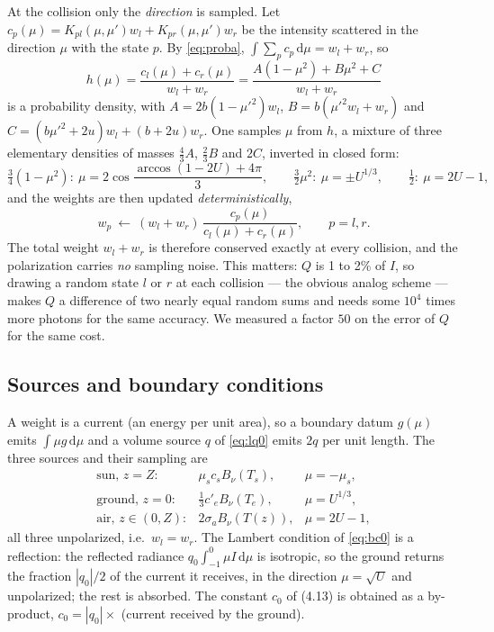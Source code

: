 \documentclass[11pt,a4paper]{article}
\renewcommand{\d}{\,\mathrm{d}}
\begin{document}
At the collision only the \emph{direction} is sampled. Let
$c_p(\mu)=K_{pl}(\mu,\mu')w_l+K_{pr}(\mu,\mu')w_r$ be the intensity scattered in the
direction $\mu$ with the state $p$. By \eqref{eq:proba}, $\int\sum_pc_p\d\mu=w_l+w_r$, so
\[
h(\mu)=\frac{c_l(\mu)+c_r(\mu)}{w_l+w_r}
=\frac{A(1-\mu^2)+B\mu^2+C}{w_l+w_r}
\]
is a probability density, with $A=2b(1-\mu'^2)w_l$, $B=b(\mu'^2w_l+w_r)$ and
$C=(b\mu'^2+2u)w_l+(b+2u)w_r$. One samples $\mu$ from $h$, a mixture of three elementary
densities of masses $\frac43A$, $\frac23B$ and $2C$, inverted in closed form:
\[
\tfrac34(1-\mu^2):\ \mu=2\cos\frac{\arccos(1-2U)+4\pi}{3},\qquad
\tfrac32\mu^2:\ \mu=\pm U^{1/3},\qquad
\tfrac12:\ \mu=2U-1,
\]
and the weights are then updated \emph{deterministically},
\begin{equation}\label{eq:wsplit}
w_p\ \longleftarrow\ (w_l+w_r)\,\frac{c_p(\mu)}{c_l(\mu)+c_r(\mu)},\qquad p=l,r .
\end{equation}
The total weight $w_l+w_r$ is therefore conserved exactly at every collision, and the
polarization carries \emph{no} sampling noise. This matters: $Q$ is 1 to 2\% of $I$, so
drawing a random state $l$ or $r$ at each collision --- the obvious analog scheme --- makes
$Q$ a difference of two nearly equal random sums and needs some $10^4$ times more photons
for the same accuracy. We measured a factor $50$ on the error of $Q$ for the same cost.

\subsection{Sources and boundary conditions}
A weight is a current (an energy per unit area), so a boundary datum $g(\mu)$ emits
$\int\mu g\d\mu$ and a volume source $q$ of \eqref{eq:lq0} emits $2q$ per unit length.
The three sources and their sampling are
\[
\begin{array}{lll}
\text{sun, } z=Z: & \mu_sc_sB_\nu(T_s), & \mu=-\mu_s,\\[2pt]
\text{ground, } z=0: & \tfrac13c'_eB_\nu(T_e), & \mu=U^{1/3},\\[2pt]
\text{air, } z\in(0,Z): & 2\sigma_aB_\nu(T(z)), & \mu=2U-1,
\end{array}
\]
all three unpolarized, i.e.\ $w_l=w_r$. The Lambert condition of \eqref{eq:bc0} is a
reflection: the reflected radiance $q_0\int_{-1}^0\mu I\d\mu$ is isotropic, so the ground
returns the fraction $|q_0|/2$ of the current it receives, in the direction $\mu=\sqrt U$
and unpolarized; the rest is absorbed. The constant $c_0$ of (4.13) is obtained as a
by-product, $c_0=|q_0|\times$ (current received by the ground).
\end{document}
